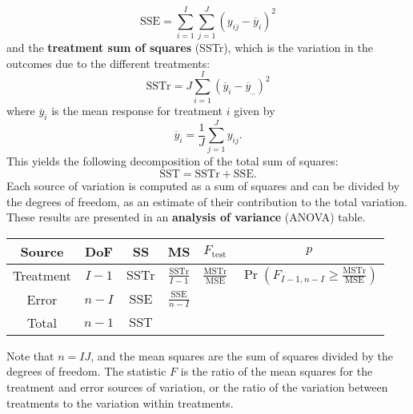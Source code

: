 \documentclass{article}
\begin{document}
\begin{equation*}
    \mathrm{SSE} = \sum_{i = 1}^I \sum_{j = 1}^J \left( y_{ij} - \overline{y}_i \right)^2
\end{equation*}
and the \textbf{treatment sum of squares} (SSTr), which is the variation in the outcomes due to the different treatments:
\begin{equation*}
    \mathrm{SSTr} = J \sum_{i = 1}^I \left( \overline{y}_i - \overline{y}_{..} \right)^2
\end{equation*}
where \(\overline{y}_i\) is the mean response for treatment \(i\) given by
\begin{equation*}
    \overline{y}_i = \frac{1}{J} \sum_{j = 1}^J y_{ij}.
\end{equation*}
This yields the following decomposition of the total sum of squares:
\begin{equation*}
    \mathrm{SST} = \mathrm{SSTr} + \mathrm{SSE}.
\end{equation*}
Each source of variation is computed as a sum of squares and can be divided by the degrees of freedom,
as an estimate of their contribution to the total variation. These results are presented in an
\textbf{analysis of variance} (ANOVA) table.
\begin{table}[H]
    \centering
    \begin{tabular}{c c c c c c}
        \toprule
        \textbf{Source} & \textbf{DoF} & \textbf{SS}       & \textbf{MS}                     & \(F_{\mathrm{test}}\)                  & \(p\)                                                                            \\
        \midrule
        Treatment       & \(I - 1\)    & \(\mathrm{SSTr}\) & \(\frac{\mathrm{SSTr}}{I - 1}\) & \(\frac{\mathrm{MSTr}}{\mathrm{MSE}}\) & \(\Pr{\left( F_{I - 1, n - I} \geq \frac{\mathrm{MSTr}}{\mathrm{MSE}} \right)}\) \\ [0.15in]
        Error           & \(n - I\)    & \(\mathrm{SSE}\)  & \(\frac{\mathrm{SSE}}{n - I}\)  &                                                                                                                           \\ [0.15in]
        Total           & \(n - 1\)    & \(\mathrm{SST}\)  &                                 &                                                                                                                           \\
        \bottomrule
    \end{tabular}
\end{table}
Note that \(n = IJ\), and the mean squares are the sum of squares divided by the degrees of freedom.
The statistic \(F\) is the ratio of the mean squares for the treatment and error sources of variation,
or the ratio of the variation between treatments to the variation within treatments.
\end{document}
